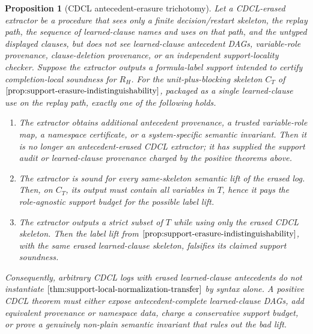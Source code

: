 \documentclass[11pt]{article}
\newtheorem{proposition}[theorem]{Proposition}
\theoremstyle{definition}
\begin{document}
\begin{proposition}[CDCL antecedent-erasure trichotomy]\label{prop:cdcl-antecedent-erasure-trichotomy}
Let a CDCL-erased extractor be a procedure that sees only a finite decision/restart skeleton, the replay path, the sequence of learned-clause names and uses on that path, and the untyped displayed clauses, but does not see learned-clause antecedent DAGs, variable-role provenance, clause-deletion provenance, or an independent support-locality checker.  Suppose the extractor outputs a formula-label support intended to certify completion-local soundness for \(R_H\).  For the unit-plus-blocking skeleton \(C_T\) of \(\Cref{prop:support-erasure-indistinguishability}\), packaged as a single learned-clause use on the replay path, exactly one of the following holds.
\begin{enumerate}[label=(\roman*)]
  \item The extractor obtains additional antecedent provenance, a trusted variable-role map, a namespace certificate, or a system-specific semantic invariant.  Then it is no longer an antecedent-erased CDCL extractor; it has supplied the support audit or learned-clause provenance charged by the positive theorems above.
  \item The extractor is sound for every same-skeleton semantic lift of the erased log.  Then, on \(C_T\), its output must contain all variables in \(T\), hence it pays the role-agnostic support budget for the possible label lift.
  \item The extractor outputs a strict subset of \(T\) while using only the erased CDCL skeleton.  Then the label lift from \(\Cref{prop:support-erasure-indistinguishability}\), with the same erased learned-clause skeleton, falsifies its claimed support soundness.
\end{enumerate}
Consequently, arbitrary CDCL logs with erased learned-clause antecedents do not instantiate \(\Cref{thm:support-local-normalization-transfer}\) by syntax alone.  A positive CDCL theorem must either expose antecedent-complete learned-clause DAGs, add equivalent provenance or namespace data, charge a conservative support budget, or prove a genuinely non-plain semantic invariant that rules out the bad lift.
\end{proposition}
\end{document}
